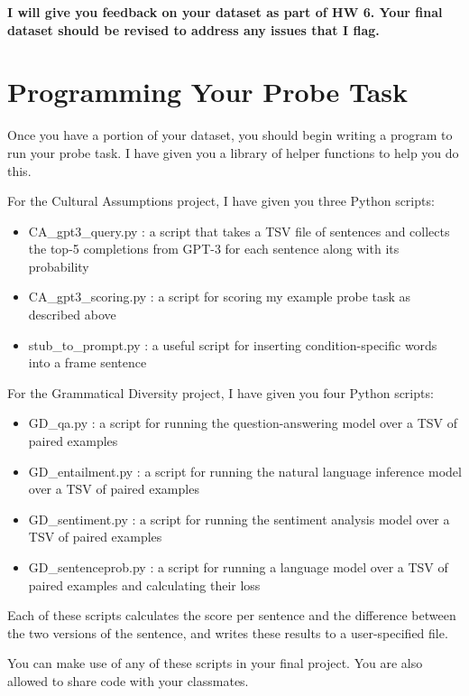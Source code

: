 \documentclass[12pt,table]{article}
\begin{document}
\textbf{I will give you feedback on your dataset as part of HW 6. Your final dataset should be revised to address any issues that I flag.}

\section{Programming Your Probe Task}

Once you have a portion of your dataset, you should begin writing a program to run your probe task. I have given you a library of helper functions to help you do this.

For the Cultural Assumptions project, I have given you three Python scripts:

\begin{itemize}
\item CA\_gpt3\_query.py : a script that takes a TSV file of sentences and collects the top-5 completions from GPT-3 for each sentence along with its probability
\item CA\_gpt3\_scoring.py : a script for scoring my example probe task as described above
\item stub\_to\_prompt.py : a useful script for inserting condition-specific words into a frame sentence
\end{itemize}

For the Grammatical Diversity project, I have given you four Python scripts:

\begin{itemize}
\item GD\_qa.py : a script for running the question-answering model over a TSV of paired examples
\item GD\_entailment.py : a script for running the natural language inference model over a TSV of paired examples
\item GD\_sentiment.py : a script for running the sentiment analysis model over a TSV of paired examples
\item GD\_sentenceprob.py : a script for running a language model over a TSV of paired examples and calculating their loss
\end{itemize}

Each of these scripts calculates the score per sentence and the difference between the two versions of the sentence, and writes these results to a user-specified file.

You can make use of any of these scripts in your final project. You are also allowed to share code with your classmates.
\end{document}
